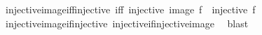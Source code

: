 \begin{isabellebody}
\isamarkupfalse%
%
\endisatagproof
{\isafoldproof}%
%
\isadelimproof
\isanewline
%
\endisadelimproof
\isanewline
{}\isamarkupfalse%
\ injective{\isacharunderscore}{\kern0pt}image{\isacharunderscore}{\kern0pt}iff{\isacharunderscore}{\kern0pt}injective\ {\isacharbrackleft}{\kern0pt}iff{\isacharbrackright}{\kern0pt}{\isacharcolon}{\kern0pt}\ {\isachardoublequoteopen}injective\ {\isacharparenleft}{\kern0pt}image\ f{\isacharparenright}{\kern0pt}\ {\isasymlongleftrightarrow}\ injective\ f{\isachardoublequoteclose}\isanewline
%
\isadelimproof
\ \ %
\endisadelimproof
%
\isatagproof
{}\isamarkupfalse%
\ injective{\isacharunderscore}{\kern0pt}image{\isacharunderscore}{\kern0pt}if{\isacharunderscore}{\kern0pt}injective\ injective{\isacharunderscore}{\kern0pt}if{\isacharunderscore}{\kern0pt}injective{\isacharunderscore}{\kern0pt}image\ \isamarkupfalse%
\ blast%
\endisatagproof
{\isafoldproof}%
%
\isadelimproof
\isanewline
%
\endisadelimproof
\isanewline
%
\isadelimtheory
\isanewline
%
\endisadelimtheory
%
\isatagtheory
{}\isamarkupfalse%
%
\endisatagtheory
{\isafoldtheory}%
%
\isadelimtheory
%
\endisadelimtheory
%
\end{isabellebody}%
\endinput
